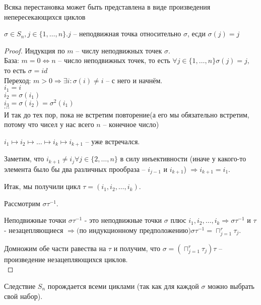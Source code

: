 \begin{theorem}{Всяка перестановка может быть представлена в виде произведения непересекающихся циклов}
\begin{Def}
	$\sigma \in S_n, j \in \{1, \dotsc, n\}. j$ -- неподвижная точка относительно $\sigma$, есди $\sigma(j) = j$
\end{Def}
\end{theorem}
\begin{proof}
	Индукция по $m$ -- числу неподвижных точек $\sigma$.\\
База: $m = 0 \Leftrightarrow n $ -- число неподвижных точек, то есть $\forall j \in \{1, \dotsc, n\} \sigma(j) = j, $ то есть $\sigma = id$\\
Переход: $m > 0 \Rightarrow \exists i: \sigma(i) \ne i$ -- с него и начнём.\\
$i_1 = i$\\
$i_2 = \sigma(i_1)$\\
$i_3 = \sigma(i_2) = \sigma^2(i_1)$\\
$\dotsb$\\
И так до тех пор, пока не встретим повторение(а его мы обязательно встретим, потому что чисел у нас всего $n$ -- конечное число)

$i_1 \mapsto i_2 \mapsto \dotsc \mapsto i_k \mapsto i_{k+1}$ -- уже встречался. 

Заметим, что $i_{k+1} \ne i_j \forall j \in \{2, \dotsc, n\}$ в силу инъективности \sigma (иначе у какого-то элемента было бы два различных прообраза -- $i_{j-1}$ и $i_{k+1}$) $\Rightarrow i_{k+1} = i_1$.  

Итак, мы получили цикл $\tau = (i_1, i_2, \dotsc, i_k)$. 

Рассмотрим $\sigma\tau^{-1}$. 

Неподвижные точки $\sigma\tau^{-1}$ - это неподвижные точки $\sigma $ плюс $i_1, i_2, \dotsc, i_k \Rightarrow \sigma\tau^{-1}$ и $\tau$ - незацепляющиеся $\Rightarrow($по индукционному предположению$) \sigma\tau^{-1} = \sqcap_{j = 1}^r \tau_j$. 

Домножим обе части равества на $\tau$ и получим, что $\sigma = (\sqcap_{j = 1}^r \tau_j)\tau$ -- произведение незацепляющихся циклов.\\
\end{proof}
\begin{theorem}{Следствие}
$S_n$ порождается всеми циклами (так как для каждой $\sigma$ можно выбрать свой набор).
\end{theorem}

